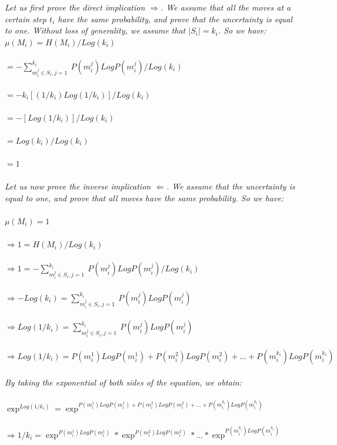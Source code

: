 \emph{Let us first prove the direct implication $\Rightarrow$. We assume that all the moves at a certain step \emph{$t_i$} have the
same probability, and prove that the uncertainty is equal to one. Without loss of generality, we assume that \emph{$|S_i|=k_i$}. So
we have:
\\ $\mu(M_i) = H(M_i)/Log(k_i)$\\
\\ $= - \sum_{m_i^j\in S_i, j=1}^{k_i}~P(m_i^j)Log P(m_i^j)/Log(k_i)$\\
\\ $= -{k_i}[(1/{k_i})Log(1/{k_i})]/Log(k_i)$\\
\\ $= -[Log(1/{k_i})]/Log(k_i)$\\
\\ $= Log(k_i)/Log(k_i)$\\
\\ $= 1$ \\\\
Let us now prove the inverse implication $\Leftarrow$. We assume that the uncertainty is
equal to one, and prove that all moves have the same probability. So we have:\\
\\ $\mu(M_i) = 1 $   \\
\\ $\Rightarrow 1= H(M_i)/Log(k_i)$\\
\\ $\Rightarrow 1= - \sum_{m_i^j\in S_i, j=1}^{k_i}~P(m_i^j)Log P(m_i^j)/Log(k_i)$\\
\\ $\Rightarrow - Log(k_i)= \sum_{m_i^j\in S_i, j=1}^{k_i}~P(m_i^j)Log P(m_i^j)$\\
\\ $\Rightarrow Log(1/k_i)= \sum_{m_i^j\in S_i, j=1}^{k_i}~P(m_i^j)Log P(m_i^j)$\\
\\ $\Rightarrow Log(1/{k_i})= P(m_i^1)Log P(m_i^1) + P(m_i^2)Log P(m_i^2)+ \ldots + P(m_i^{k_i})Log P(m_i^{k_i})$\\
\\By taking the exponential of both sides of the equation, we obtain:\\
\\ $\exp^{Log(1/{k_i})}=\exp^{P(m_i^1)Log P(m_i^1) + P(m_i^2)Log P(m_i^2)+ \ldots + P(m_i^{k_i})Log P(m_i^{k_i})}$\\
\\ $\Rightarrow 1/{k_i} = \exp^{P(m_i^1)Log P(m_i^1)} * \exp^{P(m_i^2)Log P(m_i^2)}* \ldots * \exp^{P(m_i^{k_i})Log P(m_i^{k_i})}$\\
}
